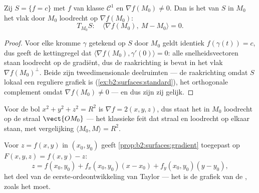 \begin{proposition}\label{prop:b2:surfaces:gradient}
Zij $S = \{f = c\}$ met $f$ van klasse $\mathcal{C}^1$ en $\nabla
f(M_0) \neq 0$. Dan is het  van $S$ in $M_0$ het vlak door
$M_0$ loodrecht op $\nabla f(M_0)$:
\[
T_{M_0}S :\quad
\langle \nabla f(M_0),\ M - M_0\rangle = 0 .
\]
\end{proposition}

\begin{proof}
Voor elke kromme $\gamma$ getekend op $S$ door $M_0$ geldt
identiek $f(\gamma(t)) = c$, dus geeft de kettingregel dat $\langle
\nabla f(M_0), \gamma'(0)\rangle = 0$: alle snelheidsvectoren staan
loodrecht op de gradiënt, dus de raakrichting is bevat in het vlak
$\nabla f(M_0)^\perp$. Beide zijn tweedimensionale deelruimten ---
de raakrichting omdat $S$ lokaal een reguliere grafiek is
(\cref{ex:b2:surfaces:standard}), het orthogonale complement omdat
$\nabla f(M_0) \neq 0$ --- en dus zijn zij gelijk.
\end{proof}

\begin{example}\label{ex:b2:surfaces:spheretangent}
Voor de bol $x^2 + y^2 + z^2 = R^2$ is $\nabla f = 2(x, y, z)$, dus
staat het  in $M_0$ loodrecht op de straal $\vect{OM_0}$
--- het klassieke feit dat straal en  loodrecht op elkaar
staan, met vergelijking $\langle M_0, M\rangle = R^2$.
\end{example}

\begin{example}\label{ex:b2:surfaces:graphtangent}
Voor $z = f(x, y)$ in $(x_0, y_0)$ geeft
\cref{prop:b2:surfaces:gradient} toegepast op $F(x,y,z) = f(x,y) -
z$:
\[
z = f(x_0, y_0)
+ f_x(x_0, y_0)(x - x_0)
+ f_y(x_0, y_0)(y - y_0) ,
\]
het  deel van de eerste-ordeontwikkeling van Taylor --- het
 is de grafiek van de , zoals het moet.
\end{example}

